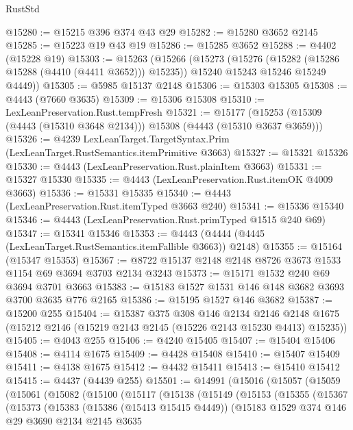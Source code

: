 \begin{lexlean}{RustStd}
\begin{coremodule}
@15280 := @15215 @396 @374 @43 @29
@15282 := @15280 @3652 @2145
@15285 := @15223 @19 @43 @19
@15286 := @15285 @3652
@15288 := @4402 (@15228 @19)
@15303 := @15263
    (@15266
      (@15273
        (@15276 (@15282 (@15286 @15288 (@4410 (@4411 @3652))) @15235))
        @15240
        @15243
        @15246
        @15249
        @4449))
@15305 := @5985 @15137 @2148
@15306 := @15303 @15305
@15308 := @4443 (@7660 @3635)
@15309 := @15306 @15308
@15310 := LexLeanPreservation.Rust.tempFresh
@15321 := @15177 (@15253 (@15309 (@4443 (@15310 @3648 @2134))) @15308 (@4443 (@15310 @3637 @3659)))
@15326 := @4239 LexLeanTarget.TargetSyntax.Prim (LexLeanTarget.RustSemantics.itemPrimitive @3663)
@15327 := @15321 @15326
@15330 := @4443 (LexLeanPreservation.Rust.plainItem @3663)
@15331 := @15327 @15330
@15335 := @4443 (LexLeanPreservation.Rust.itemOK @4009 @3663)
@15336 := @15331 @15335
@15340 := @4443 (LexLeanPreservation.Rust.itemTyped @3663 @240)
@15341 := @15336 @15340
@15346 := @4443 (LexLeanPreservation.Rust.primTyped @1515 @240 @69)
@15347 := @15341 @15346
@15353 := @4443 (@4444 (@4445 (LexLeanTarget.RustSemantics.itemFallible @3663)) @2148)
@15355 := @15164 (@15347 @15353)
@15367 := @8722 @15137 @2148 @2148 @8726 @3673 @1533 @1154 @69 @3694 @3703 @2134 @3243
@15373 := @15171 @1532 @240 @69 @3694 @3701 @3663
@15383 := @15183 @1527 @1531 @146 @148 @3682 @3693 @3700 @3635 @776 @2165
@15386 := @15195 @1527 @146 @3682
@15387 := @15200 @255
@15404 := @15387
    @375
    @308
    @146
    @2134
    @2146
    @2148
    @1675
    (@15212 @2146 (@15219 @2143 @2145 (@15226 @2143 @15230 @4413) @15235))
@15405 := @4043 @255
@15406 := @4240 @15405
@15407 := @15404 @15406
@15408 := @4114 @1675
@15409 := @4428 @15408
@15410 := @15407 @15409
@15411 := @4138 @1675
@15412 := @4432 @15411
@15413 := @15410 @15412
@15415 := @4437 (@4439 @255)
@15501 := @14991
    (@15016
      (@15057
        (@15059
          (@15061
            (@15082
              (@15100
                (@15117
                  (@15138
                    (@15149
                      (@15153
                        (@15355
                          (@15367
                            (@15373
                              (@15383
                                (@15386 (@15413 @15415 @4449))
                                (@15183
                                  @1529
                                  @374
                                  @146
                                  @29
                                  @3690
                                  @2134
                                  @2145
                                  @3635

\end{coremodule}
\end{lexlean}
